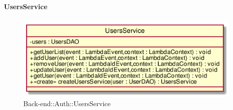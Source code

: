 \hypertarget{UsersService_label}{\paragraph{UsersService}}
\begin{figure}[h]
	\centering
	\includegraphics[width=\textwidth,height=\textheight,keepaspectratio]{images/ClassUsersService.png}
	\caption{Back-end::Auth::UsersService}
\end{figure}
